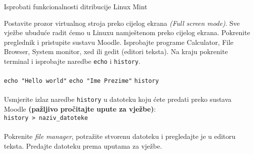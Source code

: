  \begin{zadatak} Isprobati funkcionalnosti ditribucije Linux Mint

Postavite prozor virtualnog stroja preko cijelog ekrana \textit{(Full screen mode)}. Sve vježbe ubuduće radit ćemo u Linuxu namještenom preko cijelog ekrana. Pokrenite preglednik i pristupite sustavu Moodle. Isprobajte programe Calculator, File Browser, System monitor, xed ili gedit (editori teksta). Na kraju pokrenite terminal i isprobajte naredbe \texttt{echo} i \texttt{history}.
\\
\\
\texttt{echo "Hello world"}\break
\texttt{echo "Ime Prezime"}\break
\texttt{history}
\\
\\
Usmjerite izlaz naredbe \texttt{history} u datoteku koju ćete predati preko sustava Moodle \textbf{(pažljivo pročitajte upute za vježbe)}:\\
\texttt{history  \textgreater \  naziv\_datoteke}
\\
\\
Pokrenite \textit{file manager}, potražite stvorenu datoteku i pregledajte je u editoru teksta.
Predajte datoteku prema uputama za vježbe. 

\end{zadatak}
